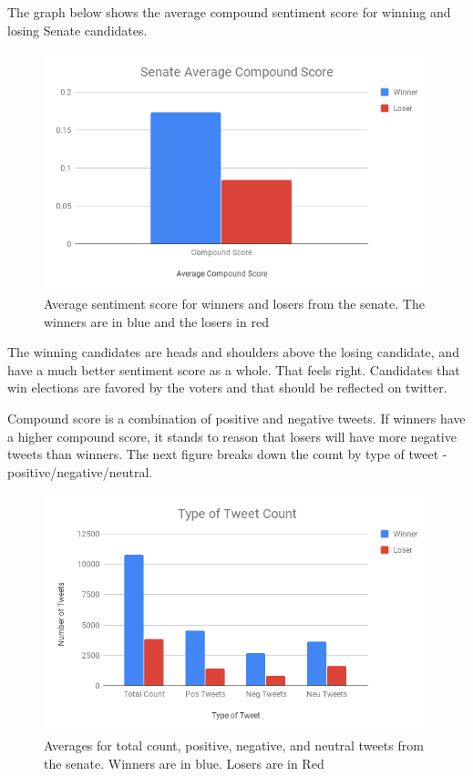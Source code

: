 \documentclass[11pt, twoside, reqno]{book}
\begin{document}
The graph below shows the average compound sentiment score for winning and losing Senate candidates.
\begin{figure}[H]
\centering
	\includegraphics[scale=0.5]{sen_ave_score}
	\caption{Average sentiment score for winners and losers from the senate. The winners are in blue and the losers in red}\label{fig:sen_ave_score}
\end{figure}
The winning candidates are heads and shoulders above the losing candidate, and have a much better sentiment score as a whole. That feels right. Candidates that win elections are favored by the voters and that should be reflected on twitter. 

Compound score is a combination of positive and negative tweets. If winners have a higher compound score, it stands to reason that losers will have more negative tweets than winners. The next figure breaks down the count by type of tweet - positive/negative/neutral. 

\begin{figure}[H]
\centering
	\includegraphics[scale=0.5]{tweet_type}
	\caption{Averages for total count, positive, negative, and neutral tweets from the senate. Winners are in blue. Losers are in Red}\label{fig:tweet_type}
\end{figure}
\end{document}
